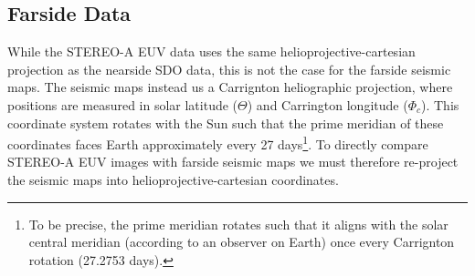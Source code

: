\documentclass[11pt,a4paper,onecolumn]{report}
\begin{document}

\subsection{Farside Data}
While the STEREO-A EUV data uses the same helioprojective-cartesian projection
as the nearside SDO data, this is not the case for the farside seismic maps. The
seismic maps instead us a Carrignton heliographic projection, where positions
are measured in solar latitude (\(\Theta\)) and Carrington longitude
(\(\Phi_c\)). This coordinate system rotates with the Sun such that the prime
meridian of these coordinates faces Earth approximately every 27
days\footnote{To be precise, the prime meridian rotates such that it aligns with
the solar central meridian (according to an observer on Earth) once every
Carrignton rotation (27.2753 days).}. To directly compare STEREO-A EUV images
with farside seismic maps we must therefore re-project the seismic maps into
helioprojective-cartesian coordinates. \\
\end{document}
